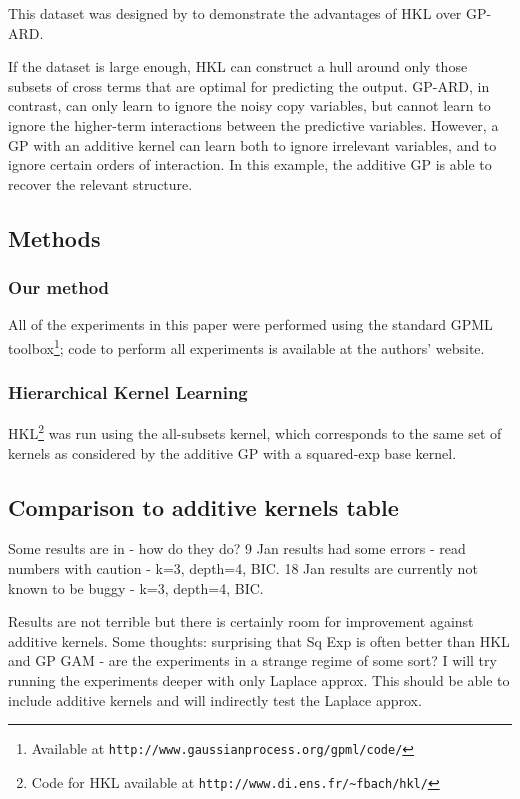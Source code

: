 \documentclass[twoside]{article}
\begin{document}
This dataset was designed by \cite{DBLP:journals/corr/abs-0909-0844} to demonstrate the advantages of HKL over GP-ARD. 

If the dataset is large enough, HKL can construct a hull around only those subsets of cross terms that are optimal for predicting the output.  GP-ARD, in contrast, can only learn to ignore the noisy copy variables, but cannot learn to ignore the higher-term interactions between the predictive variables.  However, a GP with an additive kernel can learn both to ignore irrelevant variables, and to ignore certain orders of interaction.  In this example, the additive GP is able to recover the relevant structure.

\subsection{Methods}

\subsubsection{Our method}
All of the experiments in this paper were performed using the standard GPML toolbox\footnote{Available at \texttt{http://www.gaussianprocess.org/gpml/code/}}; code to perform all experiments is available at the authors' website.

\subsubsection{Hierarchical Kernel Learning}	
HKL\footnote{Code for HKL available at \texttt{http://www.di.ens.fr/\textasciitilde fbach/hkl/}} was run using the all-subsets kernel, which corresponds to the same set of kernels as considered by the additive GP with a squared-exp base kernel.






\subsection{Comparison to additive kernels table}

Some results are in - how do they do?
9 Jan results had some errors - read numbers with caution - k=3, depth=4, BIC.
18 Jan results are currently not known to be buggy - k=3, depth=4, BIC.

Results are not terrible but there is certainly room for improvement against additive kernels.
Some thoughts: surprising that Sq Exp is often better than HKL and GP GAM - are the experiments in a strange regime of some sort?
I will try running the experiments deeper with only Laplace approx.
This should be able to include additive kernels and will indirectly test the Laplace approx.
\end{document}
